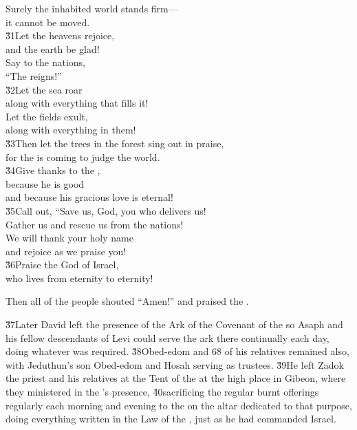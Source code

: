 \begin{poetry}
\poemll    Surely the inhabited world stands firm--- \\
\poemlll       it cannot be moved. \\
\poeml \v{31}Let the heavens rejoice, \\
\poemll    and the earth be glad! \\
\poeml Say to the nations, \\
\poemll    ``The  reigns!'' \\
\poeml \v{32}Let the sea roar \\
\poemll    along with everything that fills it! \\
\poeml Let the fields exult, \\
\poemll    along with everything in them! \\
\poeml \v{33}Then let the trees in the forest sing out in praise, \\
\poemll    for the  is coming to judge the world. \\
\poeml \v{34}Give thanks to the , \\
\poemll    because he is good \\
\poemlll       and because his gracious love is eternal! \\
\poeml \v{35}Call out, ``Save us, God, you who delivers us! \\
\poemll    Gather us and rescue us from the nations! \\
\poeml We will thank your holy name \\
\poemll    and rejoice as we praise you! \\
\poeml \v{36}Praise the  God of Israel, \\
\poemll    who lives from eternity to eternity!
\end{poetry}

Then all of the people shouted ``Amen!'' and praised the .

\v{37}Later David left the presence of the Ark of the Covenant of the  so Asaph and his fellow descendants of Levi could serve the ark there continually each day, doing whatever was required. \v{38}Obed-edom and 68 of his relatives remained also, with Jeduthun's son Obed-edom and Hosah serving as trustees. \v{39}He left Zadok the priest and his relatives at the Tent of the  at the high place in Gibeon, where they ministered in the 's presence, \v{40}sacrificing the regular burnt offerings regularly each morning and evening to the  on the altar dedicated to that purpose, doing everything written in the Law of the , just as he had commanded Israel.

